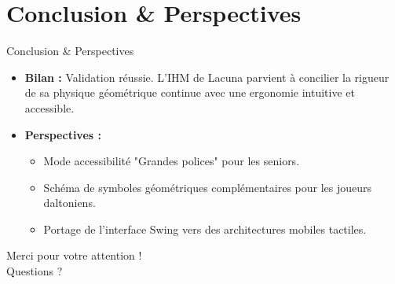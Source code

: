 \documentclass{beamer}
\begin{document}
\section{Conclusion \& Perspectives}

\begin{frame}{Conclusion \& Perspectives}
    \begin{itemize}
        \item \textbf{Bilan :} Validation réussie. L'IHM de Lacuna parvient à concilier la rigueur de sa physique géométrique continue avec une ergonomie intuitive et accessible.
        \item \textbf{Perspectives :}
        \begin{itemize}
            \item Mode accessibilité "Grandes polices" pour les seniors.
            \item Schéma de symboles géométriques complémentaires pour les joueurs daltoniens.
            \item Portage de l'interface Swing vers des architectures mobiles tactiles.
        \end{itemize}
    \end{itemize}
\end{frame}

\begin{frame}
    \begin{center}
        \Huge Merci pour votre attention !\\
        \vspace{1cm}
        \large Questions ?
    \end{center}
\end{frame}
\end{document}
